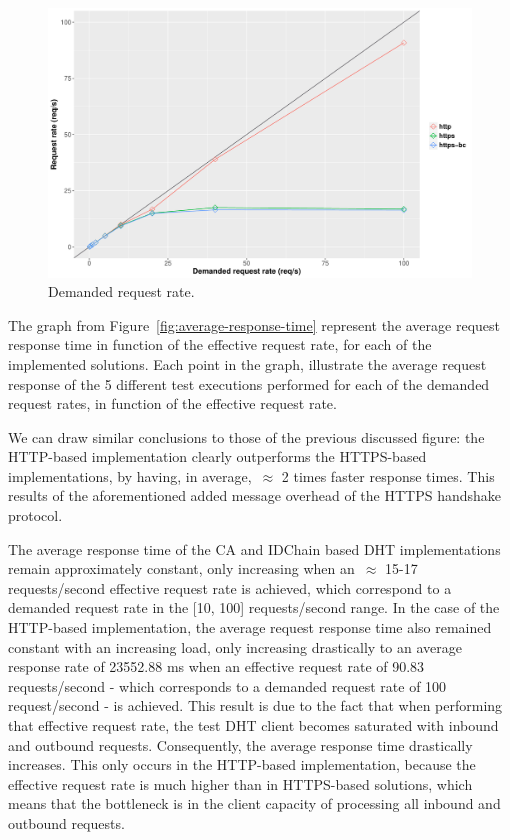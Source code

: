 \begin{figure}[h!]
  \centering
  \includegraphics[scale=0.4]{Figures/evaluation/request-rate-writes-linear.pdf}
  \caption{Demanded request rate.}
\label{fig:demanded-request-rate}
\end{figure}


The graph from Figure~\ref{fig:average-response-time} represent the average request response time in function of the effective request rate, for each of the implemented solutions.
Each point in the graph, illustrate the average request response of the 5 different test executions performed for each of the demanded request rates, in function of the effective request rate.

We can draw similar conclusions to those of the previous discussed figure: the HTTP-based implementation clearly outperforms the HTTPS-based implementations, by having, in average,~$\approx$ 2 times faster response times.
This results of the aforementioned added message overhead of the HTTPS handshake protocol.

The average response time of the CA and IDChain based DHT implementations remain approximately constant, only increasing when an~$\approx$ 15-17 requests/second effective request rate is achieved, which correspond to a demanded request rate in the [10, 100] requests/second range.
In the case of the HTTP-based implementation, the average request response time also remained constant with an increasing load, only increasing drastically to an average response rate of 23552.88 ms when an effective request rate of 90.83 requests/second - which corresponds to a demanded request rate of 100 request/second - is achieved.
This result is due to the fact that when performing that effective request rate, the test DHT client becomes saturated with inbound and outbound requests. Consequently, the average response time drastically increases.
This only occurs in the HTTP-based implementation, because the effective request rate is much higher than in HTTPS-based solutions, which means that the bottleneck is in the client capacity of processing all inbound and outbound requests.

